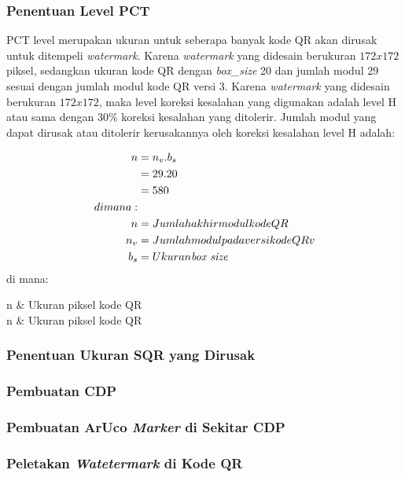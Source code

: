 \subsubsection{Penentuan Level PCT}
PCT level merupakan ukuran untuk seberapa banyak kode QR akan dirusak untuk ditempeli \emph{watermark}. Karena \emph{watermark} yang didesain berukuran $172x172$ piksel, sedangkan ukuran kode QR dengan \emph{box\_size} 20 dan jumlah modul 29 sesuai dengan jumlah modul kode QR versi 3. Karena \emph{watermark} yang didesain berukuran $172x172$, maka level koreksi kesalahan yang digunakan adalah level H atau sama dengan 30\% koreksi kesalahan yang ditolerir. Jumlah modul yang dapat dirusak atau ditolerir kerusakannya oleh koreksi kesalahan level H adalah:

\begin{align}
	n &= n_v.b_s\\&=29.20\nonumber\\&=580\nonumber\\di mana:\\n &= Jumlah akhir modul kode QR\\n_v &= Jumlah modul pada versi kode QR v\\b_s &= Ukuran \emph{box size}
\end{align}
di mana:



\begin{conditions*}
	n & Ukuran piksel kode QR\\
	n & Ukuran piksel kode QR
\end{conditions*}

\subsubsection{Penentuan Ukuran SQR yang Dirusak}

\subsubsection{Pembuatan CDP}

\subsubsection{Pembuatan ArUco \emph{Marker} di Sekitar CDP}

\subsubsection{Peletakan \emph{Watetermark} di Kode QR}

